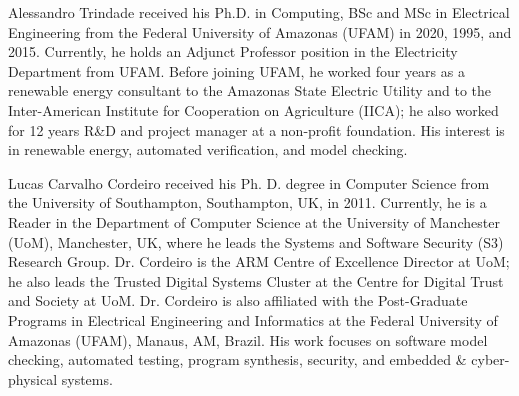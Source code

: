 \documentclass[journal]{IEEEtran}
\begin{document}
\begin{IEEEbiography}
    {Alessandro Trindade}
received his Ph.D. in Computing, BSc and MSc in Electrical Engineering from the Federal University of Amazonas (UFAM) in 2020, 1995, and 2015. Currently, he holds an Adjunct Professor position in the Electricity Department from UFAM. Before joining UFAM, he worked four years as a renewable energy consultant to the Amazonas State Electric Utility and to the Inter-American Institute for Cooperation on Agriculture (IICA); he also worked for 12 years R\&D and project manager at a non-profit foundation. His interest is in renewable energy, automated verification, and model checking.
\end{IEEEbiography}

\begin{IEEEbiography}
    {Lucas Carvalho Cordeiro}
received his Ph. D. degree in Computer Science from the University of Southampton, Southampton, UK, in 2011. Currently, he is a Reader in the Department of Computer Science at the University of Manchester (UoM), Manchester, UK, where he leads the Systems and Software Security (S3) Research Group. Dr. Cordeiro is the ARM Centre of Excellence Director at UoM; he also leads the Trusted Digital Systems Cluster at the Centre for Digital Trust and Society at UoM. Dr. Cordeiro is also affiliated with the Post-Graduate Programs in Electrical Engineering and Informatics at the Federal University of Amazonas (UFAM), Manaus, AM, Brazil. His work focuses on software model checking, automated testing, program synthesis, security, and embedded \& cyber-physical systems.
\end{IEEEbiography}
\end{document}

